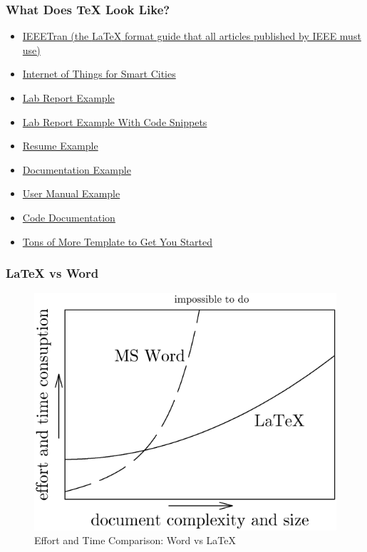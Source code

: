 \documentclass{beamer}
\begin{document}
\begin{frame}
  \frametitle{What Does {\TeX} Look Like?}
  \begin{itemize}
    \item
      \href{http://mirror.utexas.edu/ctan/macros/latex/contrib/IEEEtran/IEEEtran_HOWTO.pdf}{IEEETran
        (the {\LaTeX} format guide that all articles published by IEEE must use)}
    \item \href{https://ieeexplore.ieee.org/stamp/stamp.jsp?tp=&arnumber=6740844}{Internet of Things for Smart Cities}
    \item
      \href{../sample_docs/emags_lab/output/lab_05.pdf}{Lab Report Example}
    \item
      \href{../sample_docs/signals_lab/report/output/final_project.pdf}{Lab
        Report Example With Code Snippets}
    \item
      \href{../sample_docs/resume/output/cv_4.pdf}{Resume Example}
    \item
      \href{../sample_docs/abet_documentation/docs/output/doc.pdf}{Documentation Example}
    \item
      \href{../sample_docs/abet_instruction_manual/instructions/output/manual.pdf}{User
        Manual Example}
    \item
      \href{../sample_docs/code_documentation/report/output/calculator.pdf}{Code
        Documentation}
    \item \href{https://www.overleaf.com/latex/templates}{Tons of More Template
        to Get You Started}

  \end{itemize}
\end{frame}

\begin{frame}
  \frametitle{{\LaTeX} vs Word}
  \begin{figure}
    \includegraphics[width=0.70\framewidth]{./img/latex_vs_word_graph.png}
    \caption{Effort and Time Comparison: Word vs {\LaTeX} \cite{pintric}}
  \end{figure}
\end{frame}
\end{document}
